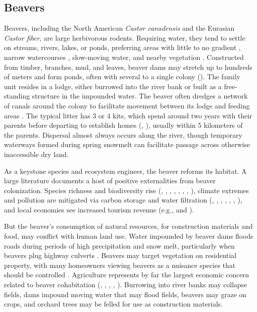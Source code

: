 \subsection{Beavers}
\label{sec:background-beavers}
Beavers, including the North American \textit{Castor canadensis} and the Eurasian \textit{Castor fiber}, are large herbivorous rodents. Requiring water, they tend to settle on streams, rivers, lakes, or ponds, preferring areas with little to no gradient \citep{muller-schwarze_beaver_2011}, narrow watercourses \citep{dittbrenner_modeling_2018}, slow-moving water, and nearby vegetation \citep{swinnen_environmental_2019}. Constructed from timber, branches, mud, and leaves, beaver dams may stretch up to hundreds of meters and form ponds, often with several to a single colony (\cite{muller-schwarze_beaver_2011}). The family unit resides in a lodge, either burrowed into the river bank or built as a free-standing structure in the impounded water. The beaver often dredges a network of canals around the colony to facilitate movement between its lodge and feeding areas \citep{muller-schwarze_beaver_2011}. The typical litter has 3 or 4 kits, which spend around two years with their parents before departing to establish homes (\cite{hartman_notes_1997}, \cite{muller-schwarze_beaver_2011}), usually within 5 kilometers of the parents. Dispersal almost always occurs along the river, though temporary waterways formed during spring snowmelt can facilitate passage across otherwise inaccessible dry land. 

As a keystone species and ecosystem engineer, the beaver reforms its habitat. A large literature documents a host of positive externalities from beaver colonization. Species richness and biodiversity rise (\cite{hossack_trends_2015}, \cite{wright_ecosystem_2002}, \cite{leidholt-bruner_beaver_1992}, \cite{bouwes_ecosystem_2016}, \cite{fedyn_beyond_2023}, \cite{kemp_qualitative_2012}, \cite{stringer_impacts_2016}, \cite{law_habitat_2016}), climate extremes and pollution are mitigated via carbon storage and water filtration (\cite{hood_beaver_2008}, \cite{dewey_beaver_2022}, \cite{johnston_beaver_2014}, \cite{fairfax_using_2018}, \cite{fairfax_smokey_2020}, \cite{lazar_beaver_2015}, \cite{wohl_landscape-scale_2013}), and local economies see increased tourism revenue (e.g., \cite{campbell_economic_2007} and \cite{auster_wildlife_2020}).

But the beaver's consumption of natural resources, for construction materials and food, may conflict with human land use. Water impounded by beaver dams floods roads during periods of high precipitation and snow melt, particularly when beavers plug highway culverts \citep{jensen_habitat_2001}. Beavers may target vegetation on residential property, with many homeowners viewing beavers as a nuisance species that should be controlled \citep{jonker_experiences_2006}. Agriculture represents by far the largest economic concern related to beaver cohabitation (\cite{hamilton_tayside_2015}, \cite{noauthor_beavers_2017}, \cite{mikulka_european_2020}, \cite{janiszewski_damage_2019}, \cite{campbell-palmer_managing_2015}). Burrowing into river banks may collapse fields, dams impound moving water that may flood fields, beavers may graze on crops, and orchard trees may be felled for use as construction materials.

